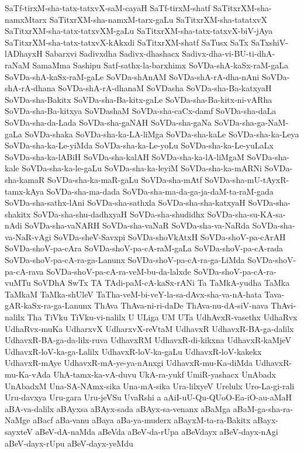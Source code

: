 {SaTf-tirxM-sha-tatx-tatxvX-saM-cayaH
SaTf-tirxM-shatf
SaTitxrXM-sha-namxMtarx
SaTitxrXM-sha-namxM-tarx-gaLu
SaTitxrXM-sha-tatatxvX
SaTitxrXM-sha-tatx-tatxvXM-gaLu
SaTitxrXM-sha-tatx-tatxvX-biV-jAya
SaTitxrXM-sha-tatx-tatxvX-kAkxdi
SaTitxrXM-shatf
SaTusx
SaTx
SaTxshiV-lADhayxH
Sabarxvi
Sadivxdha
Sadivx-dhashacx
Sadivx-dha-vi-BU-ti-dhA-raNaM
SamaMma
Sashipu
Satf-sathx-la-barxhimx
SoVDa-shA-kaSx-raM-gaLa
SoVDa-shA-kaSx-raM-gaLe
SoVDa-shAnAM
SoVDa-shA-rA-dha-nAni
SoVDa-shA-rA-dhana
SoVDa-shA-rA-dhanaM
SoVDasha
SoVDa-sha-Ba-katxyaH
SoVDa-sha-Bakitx
SoVDa-sha-Ba-kitx-gaLe
SoVDa-sha-Ba-kitx-ni-vARha
SoVDa-sha-Ba-kitxya
SoVDashaM
SoVDa-sha-caCx-damf
SoVDa-sha-daLa
SoVDa-sha-da-Lada
SoVDa-sha-gaNAH
SoVDa-sha-gaNa
SoVDa-sha-ga-NaM-gaLa
SoVDa-shaka
SoVDa-sha-ka-LA-liMga
SoVDa-sha-kaLe
SoVDa-sha-ka-Leya
SoVDa-sha-ka-Le-yiMda
SoVDa-sha-ka-Le-yoLu
SoVDa-sha-ka-Le-yuLaLx
SoVDa-sha-ka-lABiH
SoVDa-sha-kalAH
SoVDa-sha-ka-lA-liMgaM
SoVDa-sha-kale
SoVDa-sha-ka-le-gaLu
SoVDa-sha-ka-leyiM
SoVDa-sha-ka-mARNi
SoVDa-sha-kamaR
SoVDa-sha-ka-maR-gaLu
SoVDa-sha-mAtf
SoVDa-sha-mU-tAyxR-tamx-kAya
SoVDa-sha-ma-dada
SoVDa-sha-ma-da-ga-ja-daM-ta-raM-gada
SoVDa-sha-sathx-lAni
SoVDa-sha-sathxla
SoVDa-sha-sha-katxyaH
SoVDa-sha-shakitx
SoVDa-sha-shu-dadhxyaH
SoVDa-sha-shudidhx
SoVDa-sha-su-KA-sa-nAdi
SoVDa-sha-vaNARH
SoVDa-sha-vaNaR
SoVDa-sha-va-NaRda
SoVDa-sha-va-NaR-vAgi
SoVDa-sheV-Savxpi
SoVDa-shoVkAtxH
SoVDa-shoV-pa-cArAH
SoVDa-shoV-pa-cAra
SoVDa-shoV-pa-cA-raM-gaLa
SoVDa-shoV-pa-cA-rada
SoVDa-shoV-pa-cA-ra-ga-Lanunx
SoVDa-shoV-pa-cA-ra-ga-LiMda
SoVDa-shoV-pa-cA-rava
SoVDa-shoV-pa-cA-ra-veM-bu-da-lalxde
SoVDa-shoV-pa-cA-ra-vuMTu
SoVDhA
SwTx
TA
TAdi-paM-cA-kaSx-rANi
Ta
TaMkA-yudha
TaMka
TaMkaM
TaMka-shUleV
TaTha-veM-bi-veY-la-sa-dAvx-sha-va-nA-hata
Tava-gAR-kaSx-ra-ga-Lanunx
ThAva
ThAva-ni-ri-daDe
ThAva-nu-dA-siV-nava
ThAvi-nalilx
Tha
TiVku
TiVku-vi-nalilx
U
ULiga
UM
UTa
UdhAvxR-vasethx
UdhaRvx
UdhaRvx-muKa
UdharxvX
UdharxvX-reVtaM
UdhavxR
UdhavxR-BA-ga-dalilx
UdhavxR-BA-ga-da-lilx-ruva
UdhavxRM
UdhavxR-di-kikxna
UdhavxR-kaMjeV
UdhavxR-loV-ka-ga-Lalilx
UdhavxR-loV-ka-gaLu
UdhavxR-loV-kakekx
UdhavxR-mAye
UdhavxR-mA-ye-ya-nAnxgi
UdhavxR-mu-Ka-diMda
UdhavxR-mu-Ka-vAda
UhA-tamx-ka-vA-duvu
UkA-ra-yukf
UmiR-yashacx
UnAbadx
UnAbadxM
Una-SA-NAmx-sika
Una-mA-sika
Ura-lilxyeV
Urelulx
Uro-La-gi-rali
Uru-davxya
Uru-gara
Uru-jeVSu
UvaRshi
a
aAiI-uU-Qu-QUoO-Ea-iO-au-aMaH
aBA-va-dalilx
aBAyxsa
aBAyx-sada
aBAyx-sa-venanx
aBaMga
aBaM-ga-sha-ra-NaMge
aBacf
aBa-vanu
aBaya
aBa-ya-muderx
aBayxM-ta-ra-Bakitx
aBayx-sayxteV
aBeV-dA-naMda
aBeVda
aBeV-da-rUpa
aBeVdayx
aBeV-dayx-nAgi
aBeV-dayx-rUpu
aBeV-dayx-yeMdu
}
